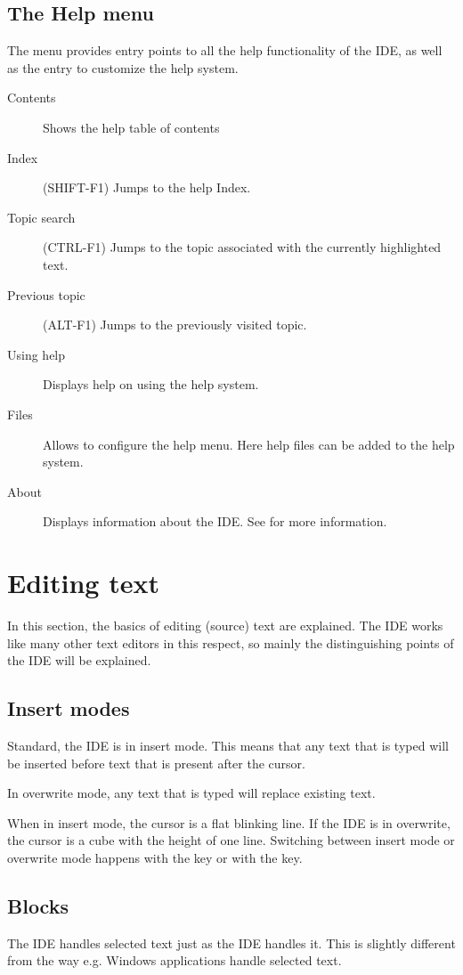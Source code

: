 \subsection{The Help menu}
\label{se:menuhelp}
The  menu provides entry points to all the help functionality of
the IDE, as well as the entry to customize the help system.
\begin{description}
\item[Contents]
Shows the help table of contents
\item[Index] (SHIFT-F1)
Jumps to the help Index.
\item[Topic search]  (CTRL-F1)
Jumps to the topic associated with the currently highlighted text.
\item[Previous topic] (ALT-F1)
Jumps to the previously visited topic.
\item[Using help]
Displays help on using the help system.
\item[Files]
Allows to configure the help menu. Here help files can be added to the help
system. 
\item[About]
Displays information about the IDE. See  for more information.
\end{description}

\section{Editing text}
\label{se:editingtext}
In this section, the basics of editing (source) text are explained. The IDE
works like many other text editors in this respect, so mainly the
distinguishing points of the IDE will be explained.

\subsection{Insert modes}
Standard, the IDE is in insert mode. This means that any text that is typed
will be inserted before text that is present after the cursor. 

In overwrite mode, any text that is typed will replace existing text. 

When in insert mode, the cursor is a flat blinking line. If the IDE is in
overwrite, the cursor is a cube with the height of one line. Switching between
insert mode or overwrite mode happens with the  key or with the
 key.
%
%
\subsection{Blocks}
\label{se:blocks}
The IDE handles selected text just as the \tp IDE handles it. This is
slightly different from the way e.g. Windows applications handle selected
text. 

